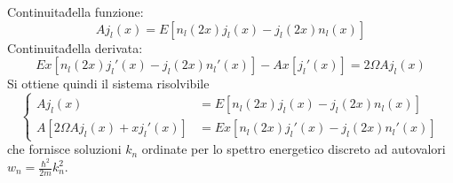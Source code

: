 \documentclass[a4paper]{article}
\begin{document}
        Continuita\' della funzione:
        \begin{equation*}
            Aj_l(x)=E\left[n_l(2x)j_l(x)-j_l(2x)n_l(x)\right]
        \end{equation*}
        Continuita\' della derivata:
        \begin{equation*}
            Ex\left[n_l(2x)j_l'(x)-j_l(2x)n_l'(x)\right]-Ax\left[j_l'(x)\right]=2\Omega Aj_l(x)
        \end{equation*}
        Si ottiene quindi il sistema risolvibile
        \begin{equation*}
            \begin{cases}
                Aj_l(x)&=E\left[n_l(2x)j_l(x)-j_l(2x)n_l(x)\right]\\
                A\left[2\Omega Aj_l(x)+xj_l'(x)\right]&=Ex\left[n_l(2x)j_l'(x)-j_l(2x)n_l'(x)\right]
            \end{cases}
        \end{equation*}
        che fornisce soluzioni $k_n$ ordinate per lo spettro energetico discreto ad autovalori $w_n=\frac{\hbar^2}{2m}k_n^2$.



    
\end{document}
